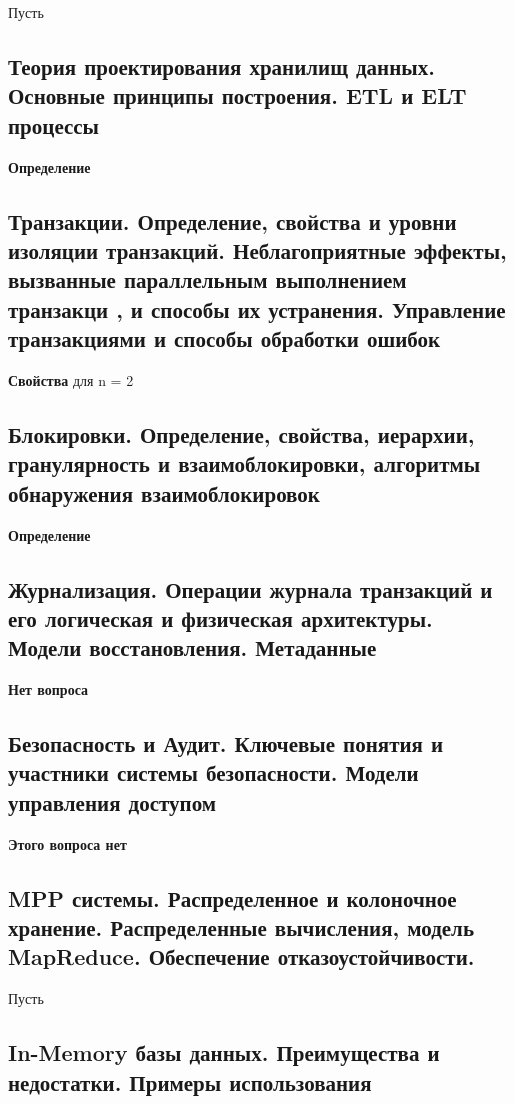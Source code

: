 Пусть 


\subsection{Теория проектирования хранилищ данных. Основные принципы построения. ETL и ELT процессы}

\textbf{Определение}

\subsection{Транзакции. Определение, свойства и уровни изоляции транзакций. Неблагоприятные эффекты, вызванные параллельным выполнением транзакци , и способы их устранения. Управление транзакциями и способы обработки ошибок}

\textbf{Свойства} для n = 2


\subsection{Блокировки. Определение, свойства, иерархии, гранулярность и взаимоблокировки, алгоритмы обнаружения взаимоблокировок}

\textbf{Определение}


\subsection{Журнализация. Операции журнала транзакций и его логическая и физическая архитектуры. Модели восстановления. Метаданные}

\textbf{Нет вопроса}

\subsection{Безопасность и Аудит. Ключевые понятия и участники системы безопасности. Модели управления доступом}

\textbf{Этого вопроса нет}


\subsection{MPP системы. Распределенное и колоночное хранение. Распределенные вычисления, модель MapReduce. Обеспечение отказоустойчивости.}

Пусть

\subsection{In-Memory базы данных. Преимущества и недостатки. Примеры использования}

